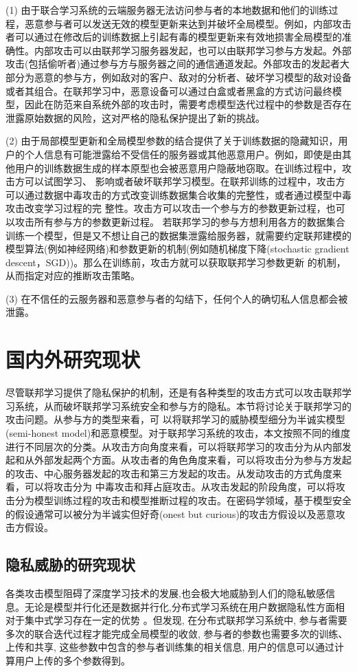(1) 由于联合学习系统的云端服务器无法访问参与者的本地数据和他们的训练过程，恶意参与者可以发送无效的模型更新来达到并破坏全局模型。例如，内部攻击者可以通过在修改后的训练数据上引起有毒的模型更新来有效地损害全局模型的准确性。内部攻击可以由联邦学习服务器发起，也可以由联邦学习参与方发起。外部攻击(包括偷听者)通过参与方与服务器之间的通信通道发起。外部攻击的发起者大部分为恶意的参与方，例如敌对的客户、敌对的分析者、破坏学习模型的敌对设备或者其组合。在联邦学习中，恶意设备可以通过白盒或者黑盒的方式访问最终模型，因此在防范来自系统外部的攻击时，需要考虑模型迭代过程中的参数是否存在泄露原始数据的风险，这对严格的隐私保护提出了新的挑战。

(2) 由于局部模型更新和全局模型参数的结合提供了关于训练数据的隐藏知识，用户的个人信息有可能泄露给不受信任的服务器或其他恶意用户。例如，即使是由其他用户的训练数据生成的样本原型也会被恶意用户隐蔽地窃取。在训练过程中，攻击方可以试图学习、 影响或者破坏联邦学习模型。在联邦训练的过程中，攻击方可以通过数据中毒攻击的方式改变训练数据集合收集的完整性，或者通过模型中毒攻击改变学习过程的完 整性。攻击方可以攻击一个参与方的参数更新过程，也可以攻击所有参与方的参数更新过程。
若联邦学习的参与方想利用各方的数据集合训练一个模型，但是又不想让自己的数据集泄露给服务器，就需要约定联邦建模的模型算法(例如神经网络)和参数更新的机制(例如随机梯度下降(stochastic gradient descent，SGD))。那么在训练前，攻击方就可以获取联邦学习参数更新 的机制，从而指定对应的推断攻击策略。

(3) 在不信任的云服务器和恶意参与者的勾结下，任何个人的确切私人信息都会被泄露。


\section{国内外研究现状}
尽管联邦学习提供了隐私保护的机制，还是有各种类型的攻击方式可以攻击联邦学习系统，从而破坏联邦学习系统安全和参与方的隐私。本节将讨论关于联邦学习的攻击问题。从参与方的类型来看，可 以将联邦学习的威胁模型细分为半诚实模型 (semi-honest model)和恶意模型。对于联邦学习系统的攻击，本文按照不同的维度进行不同层次的分类。从攻击方向角度来看，可以将联邦学习的攻击分为从内部发起和从外部发起两个方面。从攻击者的角色角度来看，可以将攻击分为参与方发起的攻击、中心服务器发起的攻击和第三方发起的攻击。从发动攻击的方式角度来看，可以将攻击分为 中毒攻击和拜占庭攻击。从攻击发起的阶段角度，可以将攻击分为模型训练过程的攻击和模型推断过程的攻击。在密码学领域，基于模型安全的假设通常可以被分为半诚实但好奇(onest but curious)的攻击方假设以及恶意攻击方假设。

\subsection{隐私威胁的研究现状}
各类攻击模型阻碍了深度学习技术的发展,也会极大地威胁到人们的隐私敏感信息。无论是模型并行化还是数据并行化,分布式学习系统在用户数据隐私性方面相对于集中式学习存在一定的优势 。但\cite{ref6}发现, 在分布式联邦学习系统中, 参与者需要多次的联合迭代过程才能完成全局模型的收敛, 参与者的参数也需要多次的训练、上传和共享, 这些参数中包含的参与者训练集的相关信息, 用户的信息可以通过计算用户上传的多个参数得到。

